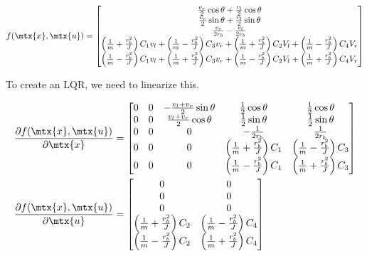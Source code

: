 \begin{equation}
  f(\mtx{x}, \mtx{u}) =
  \begin{bmatrix}
    \frac{v_r}{2}\cos\theta + \frac{v_l}{2}\cos\theta \\
    \frac{v_r}{2}\sin\theta + \frac{v_l}{2}\sin\theta \\
    \frac{v_r}{2r_b} - \frac{v_l}{2r_b} \\
    \left(\frac{1}{m} + \frac{r_b^2}{J}\right) C_1 v_l +
      \left(\frac{1}{m} - \frac{r_b^2}{J}\right) C_3 v_r +
      \left(\frac{1}{m} + \frac{r_b^2}{J}\right) C_2 V_l +
      \left(\frac{1}{m} - \frac{r_b^2}{J}\right) C_4 V_r \\
    \left(\frac{1}{m} - \frac{r_b^2}{J}\right) C_1 v_l +
      \left(\frac{1}{m} + \frac{r_b^2}{J}\right) C_3 v_r +
      \left(\frac{1}{m} - \frac{r_b^2}{J}\right) C_2 V_l +
      \left(\frac{1}{m} + \frac{r_b^2}{J}\right) C_4 V_r
  \end{bmatrix}
  \label{eq:ltv_diff_drive_f}
\end{equation}

To create an LQR, we need to linearize this.

\begin{align*}
  \frac{\partial f(\mtx{x}, \mtx{u})}{\partial\mtx{x}} &=
  \begin{bmatrix}
    0 & 0 & -\frac{v_l + v_r}{2}\sin\theta & \frac{1}{2}\cos\theta &
      \frac{1}{2}\cos\theta \\
    0 & 0 & \frac{v_l + v_r}{2}\cos\theta & \frac{1}{2}\sin\theta &
      \frac{1}{2}\sin\theta \\
    0 & 0 & 0 & -\frac{1}{2r_b} & \frac{1}{2r_b} \\
    0 & 0 & 0 & \left(\frac{1}{m} + \frac{r_b^2}{J}\right) C_1 &
      \left(\frac{1}{m} - \frac{r_b^2}{J}\right) C_3 \\
    0 & 0 & 0 & \left(\frac{1}{m} - \frac{r_b^2}{J}\right) C_1 &
      \left(\frac{1}{m} + \frac{r_b^2}{J}\right) C_3
  \end{bmatrix} \\
  \frac{\partial f(\mtx{x}, \mtx{u})}{\partial\mtx{u}} &=
  \begin{bmatrix}
    0 & 0 \\
    0 & 0 \\
    0 & 0 \\
    \left(\frac{1}{m} + \frac{r_b^2}{J}\right) C_2 &
    \left(\frac{1}{m} - \frac{r_b^2}{J}\right) C_4 \\
    \left(\frac{1}{m} - \frac{r_b^2}{J}\right) C_2 &
    \left(\frac{1}{m} + \frac{r_b^2}{J}\right) C_4
  \end{bmatrix}
\end{align*}

